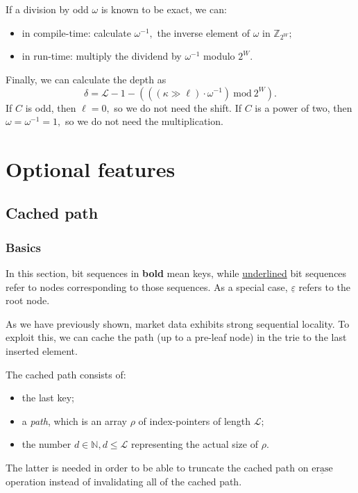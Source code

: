 \documentclass[a4paper,12pt]{article}
\newcommand{\Mod}{\ \mathrm{mod}\ }
\begin{document}
If a division by odd $\omega$ is known to be exact, we can:
\begin{itemize}
    \item in compile-time: calculate $\omega^{-1},$ the inverse element of $\omega$ in $\mathbb{Z}_{2^W};$
    \item in run-time: multiply the dividend by $\omega^{-1}$ modulo $2^W.$
\end{itemize}

Finally, we can calculate the depth as
$$
    \delta = \mathcal{L} - 1 - \left(
        \left(
            \left( \kappa \gg \ell \right)
            \cdot
            \omega^{-1}
        \right)
        \Mod
        2^{W}
    \right).
$$
If $C$ is odd, then $\ell = 0,$ so we do not need the shift.
If $C$ is a power of two, then $\omega = \omega^{-1} = 1,$
so we do not need the multiplication.

\section{Optional features}

\subsection{Cached path}

\subsubsection{Basics}

In this section, bit sequences in \textbf{bold} mean keys, while \underline{underlined} bit sequences refer to nodes corresponding to those sequences.
As a special case, $\underline{\varepsilon}$ refers to the root node.

As we have previously shown, market data exhibits strong sequential locality.
To exploit this, we can cache the path (up to a pre-leaf node) in the trie to the last inserted element.

The cached path consists of:
\begin{itemize}
    \item the last key;
    \item a \textit{path}, which is an array $\rho$ of index-pointers of length $\mathcal{L};$
    \item the number $d \in \mathbb{N}, d \le \mathcal{L}$ representing the actual size of $\rho.$
\end{itemize}
The latter is needed in order to be able to truncate the cached path on $\underline{\mathrm{erase}}$
operation instead of invalidating all of the cached path.
\end{document}
